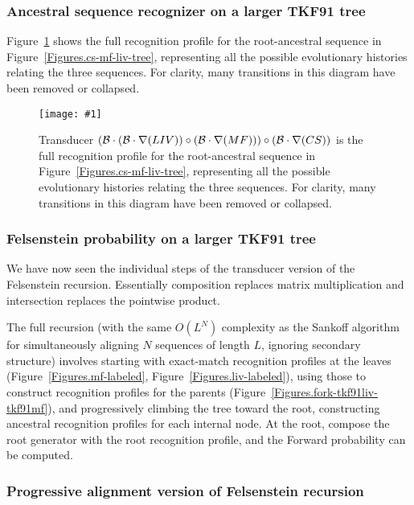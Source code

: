 \documentclass{article}
\newcommand{\figref}[1]{Figure~\ref{Figures.#1}}
\newcommand{\figlabel}[1]{\label{Figures.#1}}
\newcommand{\easyfig}[4]{
\begin{figure}
\texttt{[image: \#1]}
\caption{ \figlabel{#3} #4}
\end{figure}}
\newcommand{\widepngfig}[2]{\easyfig{#1.png}{width=\textwidth}{#1}{#2}}
\newcommand{\needfig}[1]{{\bf Need figure: } #1 }
\newcommand\tkf{{\cal B}}
\newcommand\fork{\circ}
\newcommand\recognize{\nabla}
\begin{document}
\subsubsection{Ancestral sequence recognizer on a larger TKF91 tree}

\figref{fork3-tkf91liv-tkf91mf-tkf91cs} 
shows  the full recognition profile for the 
root-ancestral sequence in \figref{cs-mf-liv-tree}, 
representing all the possible evolutionary histories relating the three sequences.  
For clarity, many transitions in this diagram have been removed or collapsed.

\widepngfig{fork3-tkf91liv-tkf91mf-tkf91cs}
{Transducer $(\tkf \cdot (\tkf \cdot \recognize(LIV))\fork(\tkf \cdot \recognize(MF)))\fork(\tkf \cdot \recognize(CS))$ 
is the full recognition profile for the root-ancestral sequence in \figref{cs-mf-liv-tree}, 
representing all the possible evolutionary histories relating the three sequences.  
For clarity, many transitions in this diagram have been removed or collapsed.
}

\subsubsection{Felsenstein probability on a larger TKF91 tree}

We have now seen the individual steps of the 
transducer version of the Felsenstein recursion.
Essentially composition replaces matrix multiplication and intersection replaces the 
pointwise product.  

The full recursion (with the same $O(L^N)$ complexity as the Sankoff algorithm \cite{SankoffCedergren83}
for simultaneously aligning $N$ sequences of length $L$, ignoring secondary structure)
involves starting with exact-match recognition profiles at the leaves (\figref{mf-labeled}, \figref{liv-labeled}),
using those to construct recognition profiles for the parents (\figref{fork-tkf91liv-tkf91mf}),
and progressively climbing the tree toward the root,
constructing ancestral recognition profiles for each internal node. 
At the root, compose the root generator with the root recognition profile,
and the Forward probability can be computed. 

\subsubsection{Progressive alignment version of Felsenstein recursion}
\end{document}
